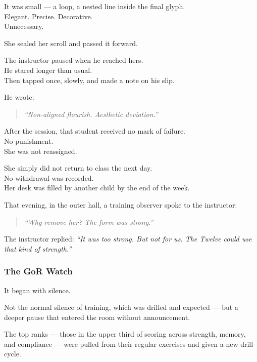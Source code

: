 \documentclass[12pt]{article}
\begin{document}
It was small — a loop, a nested line inside the final glyph.\\
Elegant. Precise. Decorative.\\
Unnecessary.

She sealed her scroll and passed it forward.

The instructor paused when he reached hers.\\
He stared longer than usual.\\
Then tapped once, slowly, and made a note on his slip.

He wrote:

\begin{quote}
\textit{“Non-aligned flourish. Aesthetic deviation.”}
\end{quote}

\vspace{1em}

After the session, that student received no mark of failure.\\
No punishment.\\
She was not reassigned.

She simply did not return to class the next day.\\
No withdrawal was recorded.\\
Her desk was filled by another child by the end of the week.

\vspace{1em}

That evening, in the outer hall, a training observer spoke to the instructor:

\begin{quote}
\textit{“Why remove her? The form was strong.”}
\end{quote}

The instructor replied: \textit{“It was too strong. But not for us. The Twelve could use that kind of strength.”}

\dotfill

\subsubsection{The GoR Watch}

It began with silence.

Not the normal silence of training, which was drilled and expected — but a deeper pause that entered the room without announcement.

The top ranks — those in the upper third of scoring across strength, memory, and compliance — were pulled from their regular exercises and given a new drill cycle.
\end{document}
